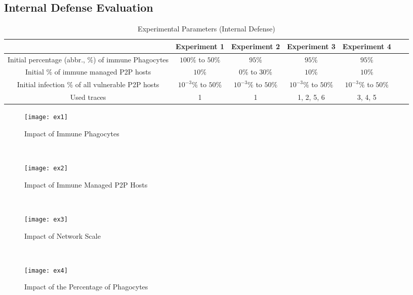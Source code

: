 \documentclass[times,10pt,twocolumn]{article}
\begin{document}
\subsection{Internal Defense Evaluation}


\begin{table*}[tbp]
    \centering
    \caption{Experimental Parameters (Internal Defense)}
    \label{tab:ex_in}
    \footnotesize{
    \begin{tabular}{|c|c|c|c|c|c|c|}
        \hline
                                                            & Experiment 1          & Experiment 2          & Experiment 3          & Experiment 4          \\
        \hline
        Initial percentage (abbr., \%) of immune Phagocytes & $100\%$ to $50\%$     & $95\%$                & $95\%$                & $95\%$                \\
        \hline
        Initial \% of immune managed P2P hosts              & $10\%$                & $0\%$ to $30\%$       & $10\%$                & $10\%$                \\
        \hline
        Initial infection \% of all vulnerable P2P hosts    & $10^{-3}\%$ to $50\%$ & $10^{-3}\%$ to $50\%$ & $10^{-3}\%$ to $50\%$ & $10^{-3}\%$ to $50\%$ \\
        \hline
        Used traces                                         & 1                     & 1                     & 1, 2, 5, 6            & 3, 4, 5               \\
        \hline
    \end{tabular}}
\end{table*}

\begin{figure*}[tbp]
    \centering
    \begin{minipage}[t]{0.243\textwidth}
        \centering
        \texttt{[image: ex1]}
        \caption{Impact of Immune Phagocytes}
        \label{fig:ex1}
    \end{minipage} \
    \begin{minipage}[t]{0.243\textwidth}
        \centering
        \texttt{[image: ex2]}
        \caption{Impact of Immune Managed P2P Hosts}
        \label{fig:ex2}
    \end{minipage} \
    \begin{minipage}[t]{0.243\textwidth}
        \centering
        \texttt{[image: ex3]}
        \caption{Impact of Network Scale}
        \label{fig:ex3}
    \end{minipage} \
    \begin{minipage}[t]{0.243\textwidth}
        \centering
        \texttt{[image: ex4]}
        \caption{Impact of the Percentage of Phagocytes}
        \label{fig:ex4}
    \end{minipage}
\end{figure*}
\end{document}
